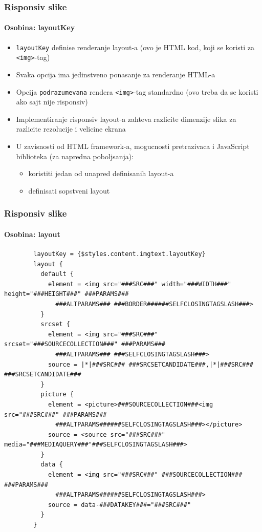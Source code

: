 \begin{frame}[fragile]
	\frametitle{Risponsiv slike}
	\framesubtitle{Osobina: layoutKey}

	\begin{itemize}
		\item \texttt{layoutKey} definise renderanje layout-a\newline
			(ovo je HTML kod, koji se koristi za \texttt{<img>}-tag)
		\item Svaka opcija ima jedinstveno ponasanje za renderanje HTML-a
		\item Opcija \texttt{podrazumevana} rendera \texttt{<img>}-tag standardno\newline
			(ovo treba da se koristi ako sajt nije risponsiv)
		\item Implementiranje risponsiv layout-a zahteva razlicite dimenzije slika za razlicite rezolucije i velicine ekrana
		\item U zavisnosti od HTML framework-a, mogucnosti pretrazivaca i JavaScript biblioteka (za napredna poboljsanja):

			\begin{itemize}
				\item koristiti jedan od unapred definisanih layout-a
				\item definisati sopstveni layout
			\end{itemize}

	\end{itemize}

\end{frame}


\begin{frame}[fragile]
	\frametitle{Risponsiv slike}
	\framesubtitle{Osobina: layout}

	\lstset{
		basicstyle=\tiny\ttfamily
	}

	\begin{lstlisting}
		layoutKey = {$styles.content.imgtext.layoutKey}
		layout {
		  default {
		    element = <img src="###SRC###" width="###WIDTH###" height="###HEIGHT###" ###PARAMS###
		      ###ALTPARAMS### ###BORDER######SELFCLOSINGTAGSLASH###>
		  }
		  srcset {
		    element = <img src="###SRC###" srcset="###SOURCECOLLECTION###" ###PARAMS###
		      ###ALTPARAMS### ###SELFCLOSINGTAGSLASH###>
		    source = |*|###SRC### ###SRCSETCANDIDATE###,|*|###SRC### ###SRCSETCANDIDATE###
		  }
		  picture {
		    element = <picture>###SOURCECOLLECTION###<img src="###SRC###" ###PARAMS###
		      ###ALTPARAMS######SELFCLOSINGTAGSLASH###></picture>
		    source = <source src="###SRC###" media="###MEDIAQUERY###"###SELFCLOSINGTAGSLASH###>
		  }
		  data {
		    element = <img src="###SRC###" ###SOURCECOLLECTION### ###PARAMS###
		      ###ALTPARAMS######SELFCLOSINGTAGSLASH###>
		    source = data-###DATAKEY###="###SRC###"
		  }
		}
	\end{lstlisting}

\end{frame}

